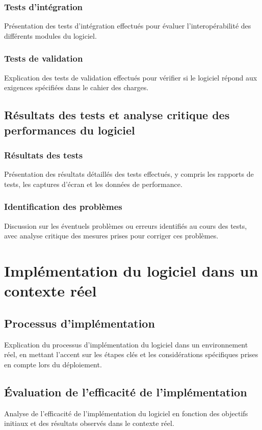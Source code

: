 \subsubsection{Tests d'intégration}
Présentation des tests d'intégration effectués pour évaluer l'interopérabilité des différents modules du logiciel.

\subsubsection{Tests de validation}
Explication des tests de validation effectués pour vérifier si le logiciel répond aux exigences spécifiées dans le cahier des charges.

\subsection{Résultats des tests et analyse critique des performances du logiciel}
\subsubsection{Résultats des tests}
Présentation des résultats détaillés des tests effectués, y compris les rapports de tests, les captures d'écran et les données de performance.

\subsubsection{Identification des problèmes}
Discussion sur les éventuels problèmes ou erreurs identifiés au cours des tests, avec analyse critique des mesures prises pour corriger ces problèmes.

\section{Implémentation du logiciel dans un contexte réel}
\subsection{Processus d'implémentation}
Explication du processus d'implémentation du logiciel dans un environnement réel, en mettant l'accent sur les étapes clés et les considérations spécifiques prises en compte lors du déploiement.

\subsection{Évaluation de l'efficacité de l'implémentation}
Analyse de l'efficacité de l'implémentation du logiciel en fonction des objectifs initiaux et des résultats observés dans le contexte réel.

